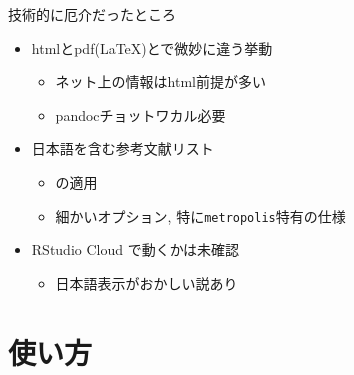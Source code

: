 \documentclass[
  12pt,
  ignorenonframetext,
]{beamer}
\providecommand{\tightlist}{%
  \setlength{\itemsep}{0pt}\setlength{\parskip}{0pt}}
\begin{document}
\begin{frame}[fragile]{技術的に厄介だったところ}
\protect\hypertarget{ux6280ux8853ux7684ux306bux5384ux4ecbux3060ux3063ux305fux3068ux3053ux308d}{}

\begin{itemize}
\tightlist
\item
  htmlとpdf(\LaTeX)とで微妙に違う挙動

  \begin{itemize}
  \tightlist
  \item
    ネット上の情報はhtml前提が多い
  \item
    pandocチョットワカル必要
  \end{itemize}
\item
  日本語を含む参考文献リスト

  \begin{itemize}
  \tightlist
  \item
    \upBibTeX の適用
  \item
    細かいオプション, 特に\texttt{metropolis}特有の仕様
  \end{itemize}
\item
  RStudio Cloud で動くかは未確認

  \begin{itemize}
  \tightlist
  \item
    日本語表示がおかしい説あり
  \end{itemize}
\end{itemize}

\end{frame}

\hypertarget{ux4f7fux3044ux65b9}{%
\section{使い方}\label{ux4f7fux3044ux65b9}}
\end{document}
